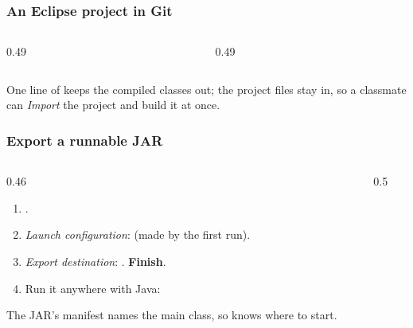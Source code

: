 \documentclass[aspectratio=169,10pt,compress]{beamer}
\begin{document}
\begin{frame}[t,fragile] \frametitle{An Eclipse project in Git}
  \begin{columns}[T]
    \begin{column}{0.49\textwidth}
    \end{column}
    \begin{column}{0.49\textwidth}
    \end{column}
  \end{columns}

  \vspace{0.1em}
  \small
  One line of  keeps the compiled classes out; the project files stay in, so a classmate can
  \emph{Import} the project and build it at once.
\end{frame}





\begin{frame}[t,fragile] \frametitle{Export a runnable JAR}
  \begin{columns}[T]
    \begin{column}{0.46\textwidth}
      \begin{enumerate}\small
        \item {}.
        \item \emph{Launch configuration}:  (made by the first run).
        \item \emph{Export destination}: . \textbf{Finish}.
        \item Run it anywhere with Java:\\ 
      \end{enumerate}
      \small The JAR's manifest names the main class, so  knows where to start.
    \end{column}
    \begin{column}{0.5\textwidth}
    \end{column}
  \end{columns}
\end{frame}
\end{document}
